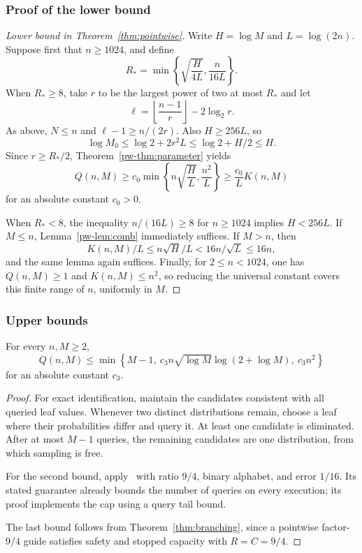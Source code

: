 \subsubsection{Proof of the lower bound}

\begin{proof}[Lower bound in Theorem~\ref{thm:pointwise}]
Write $H=\log M$ and $L=\log(2n)$. Suppose first that $n\ge1024$, and define
\[
R_* = \min\left\{\sqrt{\frac{H}{4L}},\frac{n}{16L}\right\}.
\]
When $R_*\ge8$, take $r$ to be the largest power of two at most $R_*$ and let
\[
\ell=\left\lfloor\frac{n-1}{r}\right\rfloor-2\log_2r.
\]
As above, $N\le n$ and $\ell-1\ge n/(2r)$. Also $H\ge256L$, so
\[
\log M_0\le\log2+2r^2L\le\log2+H/2\le H.
\]
Since $r\ge R_*/2$, Theorem~\ref{pw-thm:parameter} yields
\begin{equation}\label{pw-eq:optimized}
Q(n,M)\ge c_0\min\left\{n\sqrt{\frac{H}{L}},\frac{n^2}{L}\right\}
\ge\frac{c_0}{L}K(n,M)
\end{equation}
for an absolute constant $c_0>0$.

When $R_*<8$, the inequality $n/(16L)\ge8$ for $n\ge1024$ implies $H<256L$. If $M\le n$, Lemma~\ref{pw-lem:comb} immediately suffices. If $M>n$, then
\[
K(n,M)/L\le n\sqrt H/L<16n/\sqrt L\le16n,
\]
and the same lemma again suffices. Finally, for $2\le n<1024$, one has $Q(n,M)\ge1$ and $K(n,M)\le n^2$, so reducing the universal constant covers this finite range of $n$, uniformly in $M$.
\end{proof}

\subsubsection{Upper bounds}

\begin{proposition}\label{pw-prop:upper}
For every $n,M\ge2$,
\begin{equation}\label{pw-eq:upper}
Q(n,M)\le\min\left\{M-1,\ c_3n\sqrt{\log M}\log(2+\log M),\ c_3n^2\right\}
\end{equation}
for an absolute constant $c_3$.
\end{proposition}
\begin{proof}
For exact identification, maintain the candidates consistent with all queried leaf values. Whenever two distinct distributions remain, choose a leaf where their probabilities differ and query it. At least one candidate is eliminated. After at most $M-1$ queries, the remaining candidates are one distribution, from which sampling is free.

For the second bound, apply~\cite[Theorem 3.2]{gmr} with ratio $9/4$, binary alphabet, and error $1/16$. Its stated guarantee already bounds the number of queries on every execution; its proof implements the cap using a query tail bound.

The last bound follows from Theorem~\ref{thm:branching}, since a pointwise factor-$9/4$ guide satisfies safety and stopped capacity with $R=C=9/4$.
\end{proof}


